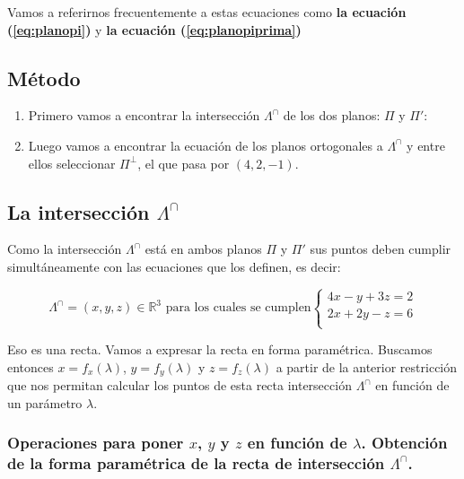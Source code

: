 \documentclass[10pt,a4paper]{article}
\begin{document}
Vamos a referirnos frecuentemente a estas ecuaciones como \textbf{la ecuación (\ref{eq:planopi})} y \textbf{la ecuación (\ref{eq:planopiprima})}


\subsection{Método}


\begin{enumerate}
  \item Primero vamos a encontrar la intersección $\Lambda^\cap$ de los dos planos: $\Pi$ y $\Pi'$:
  \item Luego vamos a encontrar la ecuación de los planos ortogonales a $\Lambda^\cap$ y
        entre ellos seleccionar $\Pi^\perp$, el que pasa por $(4,2,-1)$.
\end{enumerate}


\subsection{La intersección $\Lambda^\cap$}


Como la intersección $\Lambda^\cap$ está en ambos planos $\Pi$ y $\Pi'$ sus puntos deben cumplir simultáneamente
con las ecuaciones que los definen, es decir:

$$
  \Lambda^\cap = (x,y,z) \in \mathbb{R}^3  \text{ para los cuales se cumplen}
  \begin{cases}
    4x-y+3z=2 \text{} \\
    2x+2y-z=6 \text{} \\
  \end{cases}
$$

Eso es una recta. Vamos a expresar la recta en forma paramétrica.
Buscamos entonces $x=f_x(\lambda)$, $y=f_y(\lambda)$ y $z=f_z(\lambda)$ a partir de la anterior restricción que nos permitan calcular
los puntos de esta recta intersección $\Lambda^\cap$ en función de un parámetro $\lambda$.


\subsubsection{Operaciones para poner $x$, $y$ y $z$ en función de $\lambda$. Obtención de la forma paramétrica de la recta de intersección $\Lambda^\cap$.}
\end{document}
